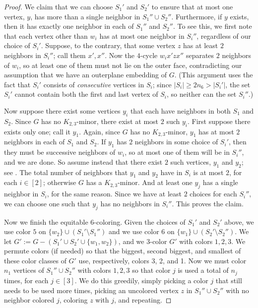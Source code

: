 \documentclass[11pt]{article}
\theoremstyle{definition}
\renewcommand\ge\geqslant
\begin{document}
\begin{proof}
	We claim that we can choose $S_1'$ and $S_2'$ to ensure that at most one vertex, $y$, has more than a single neighbor in $S_1''\cup S_2''$.
	Furthermore, if $y$ exists, then it has exactly one neighbor in each of $S_1''$ and $S_2''$.  To see this, we first note that each vertex other
	than $w_i$ has at most one neighbor in $S_i''$, regardless of our choice of $S_i'$.  Suppose, to the contrary, that some vertex $z$ has at least 
	$2$ neighbors in $S_i''$; call them
	$x',x''$.  Now the $4$-cycle $w_ix'zx''$ separates $2$ neighbors of $w_i$, so at least one of them must not lie on the outer face, contradicting
	our assumption that we have an outerplane embedding of $G$. (This argument
	uses the fact that $S_i'$ consists of \emph{consecutive} vertices in $S_i$; since $|S_i| \ge 2n_6 > |S_i'|$, the set $S_i'$ cannot contain both 
	the first and last vertex of $S_i$, so neither can the set $S_i''$.)  

	Now suppose there exist some vertices $y_i$ that each have neighbors in
	both $S_1$ and $S_2$.  Since $G$ has no $K_{2,3}$-minor, there exist at most $2$ such $y_i$.  First suppose there exists only one; call it $y_1$.
	Again, since $G$ has no $K_{2,3}$-minor, $y_1$ has at most $2$ neighbors in each of $S_1$ and $S_2$.  If $y_1$ has $2$ neighbors in some choice 
	of $S_i'$, then they must be successive neighbors of $w_i$, so at most one of them will be in $S_i''$, and we are done.  So assume instead that 
	there exist $2$ such vertices, $y_1$ and $y_2$; see .  The total number of neighbors that $y_1$ and $y_2$ have
	in $S_i$ is at most $2$, for each $i\in[2]$; otherwise $G$ has a $K_{2,3}$-minor. And at least one $y_j$ has a single neighbor in $S_i$, for the
	same reason.  Since we have at least $2$ choices for each $S_i''$, we can choose one such that $y_j$ has no neighbors in $S_i''$.  This proves the claim.

	Now we finish the equitable $6$-coloring.  Given the choices of $S_1'$ and $S_2'$ above, we use color $5$ on $\{w_2\}\cup (S_1'\setminus S_1'')$ and
	we use color $6$ on $\{w_1\}\cup (S_2'\setminus S_2'')$. We let $G':=G-(S_1'\cup S_2'\cup\{w_1,w_2\})$, and we $3$-color $G'$ with colors $1,2,3$.
	We permute colors (if needed) so that the biggest, second biggest, and smallest of these color classes of $G'$ use, respectively, colors 3, 2, and 1.
	Now we must color $n_1$ vertices of $S_1''\cup S_2''$ with colors $1,2,3$ so that color $j$ is used a total of $n_j$ times, for each $j\in[3]$.
	We do this greedily, simply picking a color $j$ that still needs to be used more times, picking an uncolored vertex $z$ in $S_1''\cup S_2''$ with 
	no neighbor colored $j$, coloring $z$ with $j$, and repeating.  


\end{proof}
\end{document}
